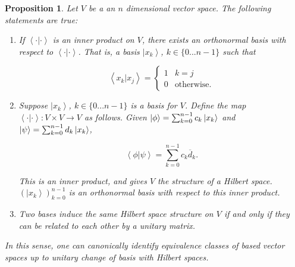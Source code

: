\documentclass{article}
\newtheorem{proposition}{Proposition}[section]
\theoremstyle{definition}
\numberwithin{figure}{section}
\begin{document}
\begin{proposition}\label{Hilbert properties} Let $V$ be a an $n$ dimensional vector space. The following statements are true:

\begin{enumerate}
\item If $\left<\cdot|\cdot\right>$ is an inner product on $V$, there exists an orthonormal basis with respect to $\left<\cdot|\cdot\right>$. That is, a basis $\left|x_k\right>$, $k\in \{0...n-1\}$ such that

$$\left<x_k|x_j\right>=
\begin{cases}
1 & k=j\\
0 & \text{otherwise}.
\end{cases}$$

\item Suppose $\left|x_k\right>$, $k\in \{0...n-1\}$ is a basis for $V$. Define the map $\left<\cdot|\cdot\right>:V\times V\to V$ as follows. Given $\left|\phi\right>=\sum_{k=0}^{n-1}c_k \left|x_k\right>$ and $\left|\psi\right>=\sum_{k=0}^{n-1}d_k\left|x_k\right>$,

$$\left<\phi|\psi\right>=\sum_{k=0}^{n-1}c_k\overline{d}_k.$$

This is an inner product, and gives $V$ the structure of a Hilbert space. $(\left|x_k\right>)_{k=0}^{n-1}$ is an orthonormal basis with respect to this inner product.

\item Two bases induce the same Hilbert space structure on $V$ if and only if they can be related to each other by a unitary matrix.
\end{enumerate}

In this sense, one can canonically identify equivalence classes of based vector spaces up to unitary change of basis with Hilbert spaces.
\end{proposition}
\end{document}
